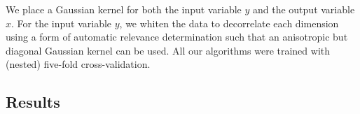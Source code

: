 \documentclass[twoside]{article} \usepackage{aistats2017}
\theoremstyle{definition}
\theoremstyle{theorem}
\begin{document}
	We place a Gaussian kernel for both the input variable $y$ and the output variable $x$. For the input variable $y$, we whiten the data to decorrelate each dimension using a form of automatic relevance determination \citep{rasmussen2006gaussian} such that an anisotropic but diagonal Gaussian kernel can be used. All our algorithms were trained with (nested) five-fold cross-validation.
	
%	
%		
%		
%
%		
%		
		
%
%
	\subsection{Results}
	\label{sec:experiments:results}
		
%
		
\end{document}
